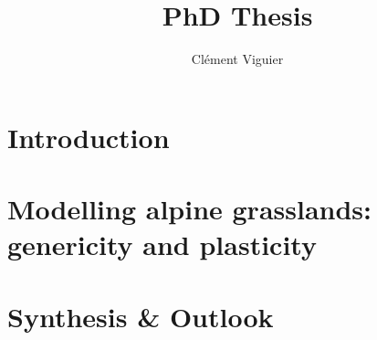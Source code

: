 \documentclass[a4paper, notoc, justified,marginals=raggedouter, nobib]{tufte-book}
\title{PhD Thesis}
\author{Clément Viguier}
\newcommand{\model}{\smallcaps{MountGrass}}
\begin{document}
\maketitlepage

\newpage

\tableofcontents

\part{Introduction}






\part{Modelling alpine grasslands: genericity and plasticity}
\setcounter{chapter}{0}
%






\part{Synthesis \& Outlook}

%





%
 
 






%
%
%
\end{document}
